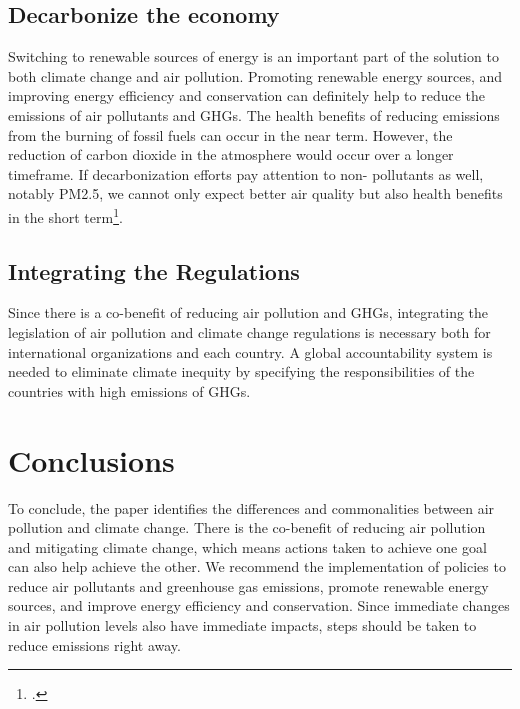 \documentclass[]{article}
\begin{document}
\subsection{Decarbonize the economy}

Switching to renewable sources of energy is an important part of the solution to both climate change and air pollution. Promoting renewable energy sources, and improving energy efficiency and conservation can definitely help to reduce the emissions of air pollutants and GHGs.
The health benefits of reducing emissions from the burning of fossil fuels can occur in the near term. However, the reduction of carbon dioxide in the atmosphere would occur over a longer timeframe. If decarbonization efforts pay attention to non- pollutants as well, notably PM2.5, we cannot only expect better air quality but also health benefits in the short term\footcite{WorldBank}.


\subsection{Integrating the Regulations}

Since there is a co-benefit of reducing air pollution and GHGs, integrating the legislation of air pollution and climate change regulations is necessary both for international organizations and each country. 
A global accountability system is needed to eliminate climate inequity by specifying the responsibilities of the countries with high emissions of GHGs.



\section{Conclusions}
\label{sec:conclusions}
To conclude, the paper identifies the differences and commonalities between air pollution and climate change. There is the co-benefit of reducing air pollution and mitigating climate change, which means actions taken to achieve one goal can also help achieve the other. We recommend the implementation of policies to reduce air pollutants and greenhouse gas emissions, promote renewable energy sources, and improve energy efficiency and conservation. 
Since immediate changes in air pollution levels also have immediate impacts, steps should be taken to reduce emissions right away. 


\pagebreak


\sloppy

\printbibliography
\end{document}
